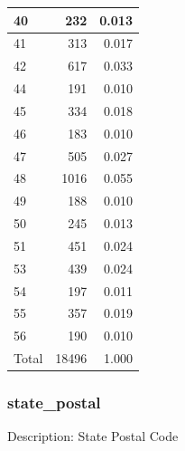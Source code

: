 \documentclass[
]{krantz}
\begin{document}
\begin{tabular}[t]{l|r|r}
\hline
40 & 232 & 0.013\\
\hline
41 & 313 & 0.017\\
\hline
42 & 617 & 0.033\\
\hline
44 & 191 & 0.010\\
\hline
45 & 334 & 0.018\\
\hline
46 & 183 & 0.010\\
\hline
47 & 505 & 0.027\\
\hline
48 & 1016 & 0.055\\
\hline
49 & 188 & 0.010\\
\hline
50 & 245 & 0.013\\
\hline
51 & 451 & 0.024\\
\hline
53 & 439 & 0.024\\
\hline
54 & 197 & 0.011\\
\hline
55 & 357 & 0.019\\
\hline
56 & 190 & 0.010\\
\hline
Total & 18496 & 1.000\\
\hline
\end{tabular}

\hypertarget{state_postal}{%
\subsubsection*{state\_postal}\label{state_postal}}


Description: State Postal Code
\end{document}
